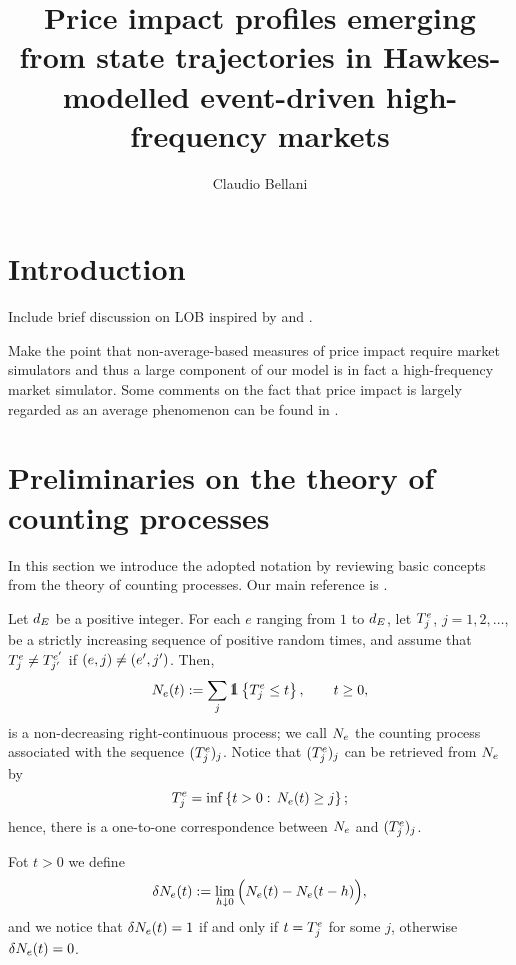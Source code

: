 \documentclass[10pt, article,table]{article}
\title{Price impact profiles emerging from state trajectories in Hawkes-modelled event-driven high-frequency markets}
\author{Claudio Bellani}
\begin{document}
 
\maketitle
\tableofcontents

\section{Introduction}
Include brief discussion on LOB inspired by \citealp[Chapter 6]{FPR13mar} and \citealp{GPWMFH13lim}.

Make the point that non-average-based measures of  price impact require market simulators and thus a large component of our model is in fact a high-frequency market simulator. Some comments on the fact that price impact is largely regarded as an average phenomenon can be found in \citealp{BMBB19imp}. 

\section{Preliminaries on the theory of counting processes} 
In this section we introduce the adopted notation by reviewing basic concepts from the theory of counting processes. Our main reference is \citealp[Chapter 14]{DVJ08int}.

Let $\numEventTypes$ be a positive integer. For each $e$ ranging from $1$ to $\numEventTypes$, let $\arrivalTimes_{j}$, $j=1, 2, \dots$, be a strictly increasing sequence of positive random times, and assume that $\arrivalTimes_{j}\neq\arrivalTimes[e\derivative]_{j\derivative}$ if $(e,j)\neq (e\derivative,j\derivative)$. Then, 
\begin{equation*}
 \countingProc(t):= \sum_{j} \one\left\lbrace\arrivalTimes_{j}\leq t \right\rbrace, \qquad t\geq 0,
\end{equation*}
is a non-decreasing right-continuous process; we call $\countingProc$ the counting process associated with the sequence $(\arrivalTimes_{j})_j$. Notice that $(\arrivalTimes_{j})_j$ can be retrieved from $\countingProc$ by 
\begin{equation*}
 \arrivalTimes_{j} = \inf \left\lbrace t>0: \, \countingProc(t)\geq j\right\rbrace;
\end{equation*}
hence, there is a one-to-one correspondence between $\countingProc$ and $(\arrivalTimes_{j})_j$. 

Fot $t>0$ we define 
\begin{equation*}
 \delta\countingProc(t):= \lim_{h\downarrow 0} \Big( \countingProc(t) - \countingProc(t-h) \Big),
\end{equation*}
and we notice that $\delta \countingProc(t) = 1$ if and only if $t=\arrivalTimes_{j}$ for some $j$, otherwise $\delta \countingProc(t) = 0$.
\end{document}
